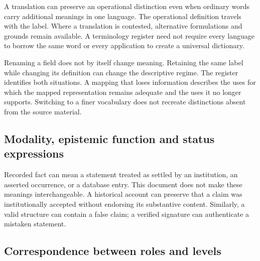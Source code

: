 \documentclass[11pt,a4paper]{article}
\begin{document}
A translation can preserve an operational distinction even when ordinary words carry additional meanings in one language. The operational definition travels with the label. Where a translation is contested, alternative formulations and grounds remain available. A terminology register need not require every language to borrow the same word or every application to create a universal dictionary.

Renaming a field does not by itself change meaning. Retaining the same label while changing its definition can change the descriptive regime. The register identifies both situations. A mapping that loses information describes the uses for which the mapped representation remains adequate and the uses it no longer supports. Switching to a finer vocabulary does not recreate distinctions absent from the source material.

\subsection{Modality, epistemic function and status expressions}


Recorded fact can mean a statement treated as settled by an institution, an asserted occurrence, or a database entry. This document does not make these meanings interchangeable. A historical account can preserve that a claim was institutionally accepted without endorsing its substantive content. Similarly, a valid structure can contain a false claim; a verified signature can authenticate a mistaken statement.

\subsection{Correspondence between roles and levels}
\end{document}
